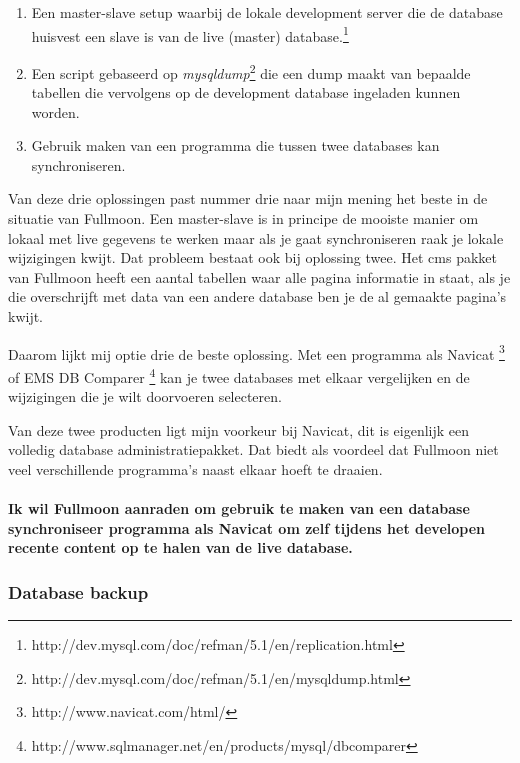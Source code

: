\documentclass[12pt,a4paper]{article}
\begin{document}
    \begin{enumerate}
      \item Een master-slave setup waarbij de lokale development server die de database huisvest een slave is van de live (master) database.\footnote{ http://dev.mysql.com/doc/refman/5.1/en/replication.html}
      \item Een script gebaseerd op \emph{mysqldump}\footnote{ http://dev.mysql.com/doc/refman/5.1/en/mysqldump.html} die een dump maakt van bepaalde tabellen die vervolgens op de development database ingeladen kunnen worden.
      \item Gebruik maken van een programma die tussen twee databases kan synchroniseren.
    \end{enumerate}
    
    Van deze drie oplossingen past nummer drie naar mijn mening het beste in de situatie van Fullmoon. Een master-slave is in principe de mooiste manier om lokaal met live gegevens te werken maar als je gaat synchroniseren raak je lokale wijzigingen kwijt. Dat probleem bestaat ook bij oplossing twee. Het {\sc cms} pakket van Fullmoon heeft een aantal tabellen waar alle pagina informatie in staat, als je die overschrijft met data van een andere database ben je de al gemaakte pagina's kwijt.
    
    Daarom lijkt mij optie drie de beste oplossing. Met een programma als Navicat \footnote{ http://www.navicat.com/html/} of EMS DB Comparer \footnote{ http://www.sqlmanager.net/en/products/mysql/dbcomparer} kan je twee databases met elkaar vergelijken en de wijzigingen die je wilt doorvoeren selecteren.
    
    Van deze twee producten ligt mijn voorkeur bij Navicat, dit is eigenlijk een volledig database administratiepakket. Dat biedt als voordeel dat Fullmoon niet veel verschillende programma's naast elkaar hoeft te draaien.
    
    \paragraph{Ik wil Fullmoon aanraden om gebruik te maken van een database synchroniseer programma als Navicat om zelf tijdens het developen recente content op te halen van de live database.}
    
    \subsubsection{Database backup}
    
\end{document}
